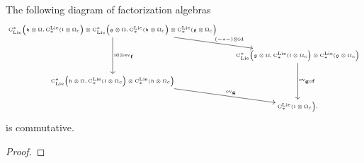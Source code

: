 \documentclass[11pt]{amsart}
\numberwithin{equation}{section}
\begin{document}
 
 
\begin{lmm}\label{L:NatPptyofComp}
 The following diagram of factorization algebras 
 \[\tiny \begin{tikzcd}
 \clies\big(\fh \otimes \Omega, \cliels(\fl \otimes \Omega_c  \big) 
 \otimes  \clies\big(\fg \otimes \Omega, \cliels(\fh \otimes \Omega_c  \big) 
 \otimes \cliels(\fg \otimes \Omega_c  \big) \arrow[rd, "(-\star-)\otimes \id"]
 \arrow[dd, "\id\otimes \ev_ {\mathbf{f}}"]& \\ 
 & \clies\big(\fg \otimes \Omega, \cliels(\fl \otimes \Omega_c  \big) 
 \otimes \cliels(\fg \otimes \Omega_c  \big)
 \arrow[dd, "\ev_{\mathbf{g}\circ \mathbf{f}}"]\\
\clies\big(\fh \otimes \Omega, \cliels(\fl \otimes \Omega_c  \big) 
 \otimes \cliels(\fh \otimes \Omega_c  \big)  \arrow[rd, "\ev_{\mathbf{g}}"] & \\  & \cliels(\fl \otimes \Omega_c  \big). 
\end{tikzcd}\]
 is commutative.
\end{lmm}

\begin{proof}
\end{proof}
\end{document}
